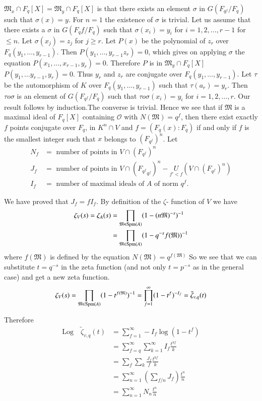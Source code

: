 $\mathfrak{M}_x \cap F_q[X]=\mathfrak{M}_y\cap F_q[X]$ is that there
exists an element $\sigma$ in $G(F_{q^f}/F_q)$ such that $\sigma
(x)=y$. For $n=1$ the existence of $\sigma $ is trivial. Let us assume
that there exists a $\sigma$ in $G(F_q f/F_q)$ such that $\sigma
(x_i)=y_i$ for $i=1,2,\ldots, r-1$ for $\leq n$. Let $\sigma(x_j)=z_j$
for $j\geq r$. Let $P(x)$ be the  polynomial of $z_r$ over
$F_q(y_1,\ldots,y_{r-1})$. Then $P(y_1,\ldots, y_{r-1} z_r)=0$, which
gives on applying $\sigma$ the equation
$P(x_1,\ldots,x_{r-1},y_r)=0$. Therefore $P$ is in $\mathfrak{M}_y
\cap F_q [X]$ \iec $P(y_1, \ldots y_{r-1}, y_r)=0$. 
Thus $y_r$ and $z_r$ are conjugate over $F_q(y_1,\ldots
,y_{r-1})$. Let $\tau $ be the automorphism of $K$ over
$F_q(y_1,\ldots,y_{r-1})$ such that $\tau (a_r)=y_r$. Then $\tau o
\sigma $ is an element of $G(F_{q^f}/F_q)$ such that $\tau o \sigma (x_i)
= y_i $ for $i = 1,2,\ldots,r$. Our result follows by induction.\pageoriginale The
converse is trivial. Hence we see that if $\mathfrak{M}$ is a maximal
ideal of $F_q[X]$ containing $\mathscr{O}$ with $N(\mathfrak{M}) =
q^f$, then there exist exactly $f$ points conjugate over $F_q$, in
$K^n\cap V$ and $f = (F_q(x):F_q)$ if and only if $f$ is the smallest
integer such that $x$ belongs to $(F_{q^f})^n$. Let 
\begin{align*}
  N_f & = \text{ number of points in } V\cap (F_{q^f})^n\\
  J_f & = \text{ number of points in } V\cap
  ({F_{q^f}}_{q^f})^{n}-\underset{f'<f}{U}(V \cap (F_{q^f})^n)\\ 
  I_f & = \text{ number of maximal ideals of $A$ of norm $q^f$}.
\end{align*}

We have proved that $J_f = fI_f$. By definition of the $\zeta$-
function of $V$ we have  
\begin{align*}
  \zeta_V(s) = \zeta_A(s) & = \prod_{\mathfrak{M}\in
    \operatorname{Spm}(A)}(1-(n\mathfrak{M})^{-s})^{-1}\\ 
  & = \prod_{\mathfrak{M}\in \operatorname{Spm}(A)}(1-q^{-s} f(\mathfrak{M}))^{-1}
\end{align*}
where $f(\mathfrak{M})$ is defined by the equation $N(\mathfrak{M}) =
q^{f(\mathfrak{M})}$  So we see that we can substitute $t=q^{-s}$ in
the zeta function (and not only $t=p^{-s}$ as in the general case) and
get a new zeta function. 
$$
\zeta_V (s)= \prod_{\mathfrak{M}\in \operatorname{Spm}(A)}(1-t^{f(\mathfrak{M})})^{-1}
= \prod^{\infty}_{f=1} (1-t^f)^{-I_f} = \tilde{\zeta}_{v,q}(t) 
$$

Therefore
\begin{align*}
  \text{Log} \quad \tilde{\zeta}_{v,q} (t) & =
  \sum^{\infty}_{f=1}-I_f \log(1-t^f)\\ 
  & = \sum_{f=q}^{\infty} \sum_{k=1}^{\infty} I_f \frac{t^{kf}}{k}\\
  & = \sum_f \sum_k \frac{J_f}{f} \frac{t^{kf}}{k}\\
  & =\sum_{n=1}^{\infty}\left(\sum_{f/n}J_f\right)\frac{t^n}{n}\\
  & = \sum_{n=1}^{\infty} N_n \frac{t^n}{n}
\end{align*}\pageoriginale

